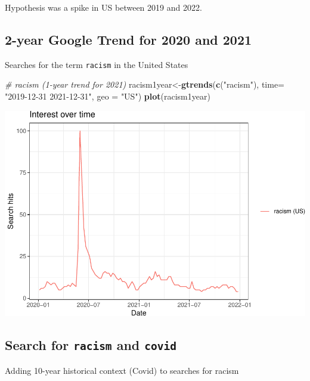 \documentclass[
]{article}
\newenvironment{Shaded}{\begin{snugshade}}{\end{snugshade}}
\newcommand{\AttributeTok}[1]{\textcolor[rgb]{0.13,0.29,0.53}{#1}}
\newcommand{\CommentTok}[1]{\textcolor[rgb]{0.56,0.35,0.01}{\textit{#1}}}
\newcommand{\FunctionTok}[1]{\textcolor[rgb]{0.13,0.29,0.53}{\textbf{#1}}}
\newcommand{\NormalTok}[1]{#1}
\newcommand{\OtherTok}[1]{\textcolor[rgb]{0.56,0.35,0.01}{#1}}
\newcommand{\StringTok}[1]{\textcolor[rgb]{0.31,0.60,0.02}{#1}}
\begin{document}
Hypothesis was a spike in US between 2019 and 2022.

\hypertarget{year-google-trend-for-2020-and-2021}{%
\subsection{2-year Google Trend for 2020 and
2021}\label{year-google-trend-for-2020-and-2021}}

Searches for the term \texttt{racism} in the United States

\begin{Shaded}
\begin{Highlighting}[]
\CommentTok{\# racism (1{-}year trend for 2021)}
\NormalTok{racism1year}\OtherTok{\textless{}{-}}\FunctionTok{gtrends}\NormalTok{(}\FunctionTok{c}\NormalTok{(}\StringTok{"racism"}\NormalTok{), }\AttributeTok{time=} \StringTok{"2019{-}12{-}31 2021{-}12{-}31"}\NormalTok{, }\AttributeTok{geo =} \StringTok{"US"}\NormalTok{)}
\FunctionTok{plot}\NormalTok{(racism1year)}
\end{Highlighting}
\end{Shaded}

\includegraphics{overview-keyword-racism_files/figure-latex/unnamed-chunk-3-1.pdf}

\hypertarget{search-for-racism-and-covid}{%
\subsection{\texorpdfstring{Search for \texttt{racism} and
\texttt{covid}}{Search for racism and covid}}\label{search-for-racism-and-covid}}

Adding 10-year historical context (Covid) to searches for racism
\end{document}

